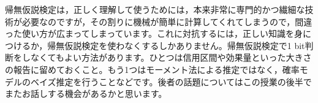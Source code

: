 \documentclass{ltjsarticle}
\begin{document}
帰無仮説検定は，正しく理解して使うためには，本来非常に専門的かつ繊細な技術が必要なのですが，その割りに機械が簡単に計算してくれてしまうので，間違った使い方が広まってしまっています。これに対抗するには，正しい知識を身につけるか，帰無仮説検定を使わなくするしかありません。帰無仮説検定で1 bit判断をしなくてもよい方法があります。ひとつは信用区間や効果量といった大きさの報告に留めておくこと。もう1つはモーメント法による推定ではなく，確率モデルのベイズ推定を行うことなどです。後者の話題についてはこの授業の後半でまたお話しする機会があるかと思います。





\end{document}
